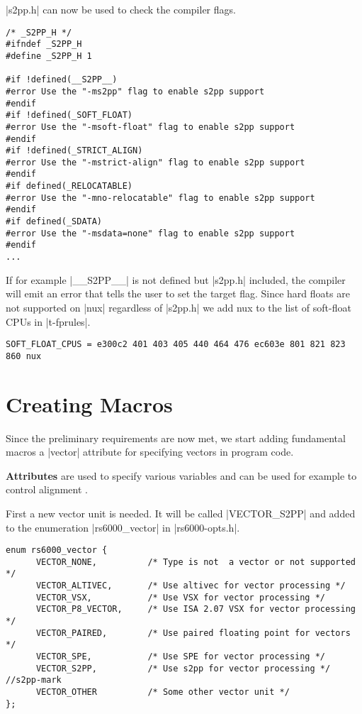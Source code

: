 |s2pp.h| can now be used to check the compiler flags.
\begin{lstlisting}
/* _S2PP_H */
#ifndef _S2PP_H
#define _S2PP_H 1

#if !defined(__S2PP__)
#error Use the "-ms2pp" flag to enable s2pp support
#endif
#if !defined(_SOFT_FLOAT)
#error Use the "-msoft-float" flag to enable s2pp support
#endif
#if !defined(_STRICT_ALIGN)
#error Use the "-mstrict-align" flag to enable s2pp support
#endif
#if defined(_RELOCATABLE)
#error Use the "-mno-relocatable" flag to enable s2pp support
#endif
#if defined(_SDATA)
#error Use the "-msdata=none" flag to enable s2pp support
#endif
...
\end{lstlisting}

If for example |__S2PP__| is not defined but |s2pp.h| included, the compiler will emit an error that tells the user to set the target flag.
Since hard floats are not supported on |nux| regardless of |s2pp.h| we add nux to the list of soft-float CPUs in |t-fprules|.
\begin{lstlisting}
SOFT_FLOAT_CPUS = e300c2 401 403 405 440 464 476 ec603e 801 821 823 860 nux
\end{lstlisting}

\section{Creating Macros}
Since the preliminary requirements are now met, we start adding fundamental macros a |vector| attribute for specifying vectors in program code.

\textbf{Attributes} are used to specify various variables and can be used for example to control alignment \citep{GCCint:attributes}.

First a new vector unit is needed.
It will be called |VECTOR_S2PP| and added to the enumeration |rs6000_vector| in |rs6000-opts.h|.
\begin{lstlisting}
enum rs6000_vector {
      VECTOR_NONE,          /* Type is not  a vector or not supported */
      VECTOR_ALTIVEC,       /* Use altivec for vector processing */
      VECTOR_VSX,           /* Use VSX for vector processing */
      VECTOR_P8_VECTOR,     /* Use ISA 2.07 VSX for vector processing */
      VECTOR_PAIRED,        /* Use paired floating point for vectors */
      VECTOR_SPE,           /* Use SPE for vector processing */
      VECTOR_S2PP,          /* Use s2pp for vector processing */ //s2pp-mark
      VECTOR_OTHER          /* Some other vector unit */
};
\end{lstlisting}

